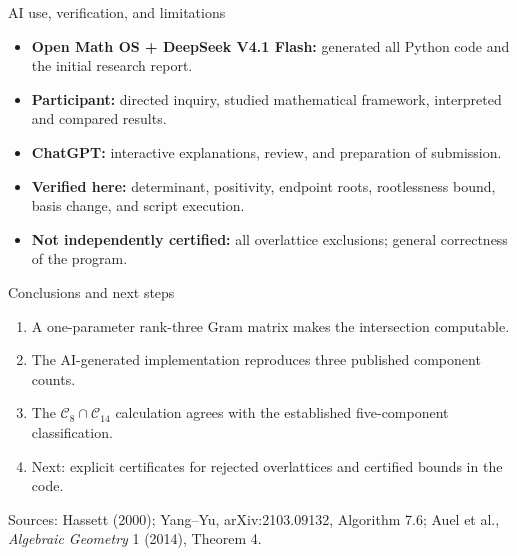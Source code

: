 \documentclass[aspectratio=169,11pt]{beamer}
\begin{document}
\begin{frame}{AI use, verification, and limitations}
\begin{itemize}\item \textbf{Open Math OS + DeepSeek V4.1 Flash:} generated all Python code and the initial research report.\item \textbf{Participant:} directed inquiry, studied mathematical framework, interpreted and compared results.\item \textbf{ChatGPT:} interactive explanations, review, and preparation of submission.\item \textbf{Verified here:} determinant, positivity, endpoint roots, rootlessness bound, basis change, and script execution.\item \textbf{Not independently certified:} all overlattice exclusions; general correctness of the program.\end{itemize}
\end{frame}
\begin{frame}{Conclusions and next steps}
\begin{enumerate}\item A one-parameter rank-three Gram matrix makes the intersection computable.\item The AI-generated implementation reproduces three published component counts.\item The $\mathcal C_8\cap\mathcal C_{14}$ calculation agrees with the established five-component classification.\item Next: explicit certificates for rejected overlattices and certified bounds in the code.\end{enumerate}
\vspace{0.7em}\footnotesize Sources: Hassett (2000); Yang--Yu, arXiv:2103.09132, Algorithm 7.6; Auel et al., \emph{Algebraic Geometry} 1 (2014), Theorem 4.
\end{frame}
\end{document}
